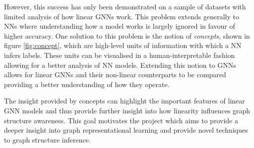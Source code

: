 
However, this success has only been demonstrated on a sample of datasets with limited analysis of how linear GNNs work.
This problem extends generally to NNs where understanding how a model works is largely ignored in favour of higher accuracy.
One solution to this problem is the notion of \emph{concepts}, shown in figure \ref{fig:concept}, which are high-level units of information \cite{ghorbani2019towards} with which a NN infers labels.
These units can be visualised in a human-interpretable fashion allowing for a better analysis of NN models.
Extending this notion to GNNs\cite{magister2021gcexplainer,ying2019gnnexplainer} allows for linear GNNs and their non-linear counterparts to be compared providing a better understanding of how they operate.

The insight provided by concepts can highlight the important features of linear GNN models and thus provide further insight into how linearity influences graph structure awareness.
This goal motivates the project which aims to provide a deeper insight into graph representational learning and provide novel techniques to graph structure inference.


